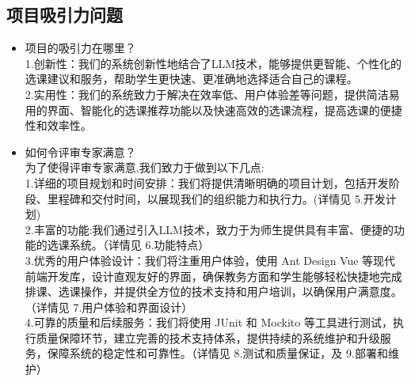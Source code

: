 \documentclass{article}
\begin{document}
\subsection{项目吸引力问题}
\begin{itemize}
	\item 项目的吸引力在哪里？\\
	1.创新性：我们的系统创新性地结合了LLM技术，能够提供更智能、个性化的选课建议和服务，帮助学生更快速、更准确地选择适合自己的课程。\\
	2.实用性：我们的系统致力于解决在效率低、用户体验差等问题，提供简洁易用的界面、智能化的选课推荐功能以及快速高效的选课流程，提高选课的便捷性和效率性。\\
	\item 如何令评审专家满意？\\
	为了使得评审专家满意,我们致力于做到以下几点:\\
	1.详细的项目规划和时间安排：我们将提供清晰明确的项目计划，包括开发阶段、里程碑和交付时间，以展现我们的组织能力和执行力。(详情见 5.开发计划)\\
	2.丰富的功能:我们通过引入LLM技术，致力于为师生提供具有丰富、便捷的功能的选课系统。（详情见 6.功能特点）\\
	3.优秀的用户体验设计：我们将注重用户体验，使用 Ant Design Vue 等现代前端开发库，设计直观友好的界面，确保教务方面和学生能够轻松快捷地完成排课、选课操作，并提供全方位的技术支持和用户培训，以确保用户满意度。（详情见 7.用户体验和界面设计）\\
	4.可靠的质量和后续服务：我们将使用 JUnit 和 Mockito 等工具进行测试，执行质量保障环节，建立完善的技术支持体系，提供持续的系统维护和升级服务，保障系统的稳定性和可靠性。（详情见 8.测试和质量保证，及 9.部署和维护）\\
\end{itemize}
\end{document}
